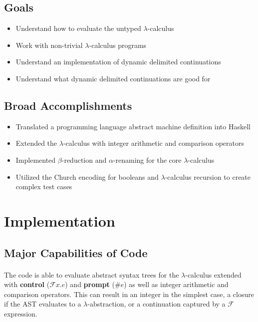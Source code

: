 \documentclass{article}
\begin{document}
\subsection*{Goals}

\begin{itemize}
\item Understand how to evaluate the untyped $\lambda$-calculus
\item Work with non-trivial $\lambda$-calculus programs
\item Understand an implementation of dynamic delimited continuations
\item Understand what dynamic delimited continuations are good for
\end{itemize}

\subsection*{Broad Accomplishments}

\begin{itemize}
\item Translated a programming language abstract machine definition into Haskell
\item Extended the $\lambda$-calculus with integer arithmetic and comparison operators
\item Implemented $\beta$-reduction and $\alpha$-renaming for the core $\lambda$-calculus
\item Utilized the Church encoding for booleans and $\lambda$-calculus recursion to create complex test cases
\end{itemize}

\section*{Implementation}

\subsection*{Major Capabilities of Code}

\paragraph{}
The code is able to evaluate abstract syntax trees for the $\lambda$-calculus extended with \textbf{control} ($\mathcal{F}x.e$) and \textbf{prompt} ($\#e$) as well as integer arithmetic and comparison operators. This can result in an integer in the simplest case, a closure if the AST evaluates to a $\lambda$-abstraction, or a continuation captured by a $\mathcal{F}$ expression.
\end{document}
